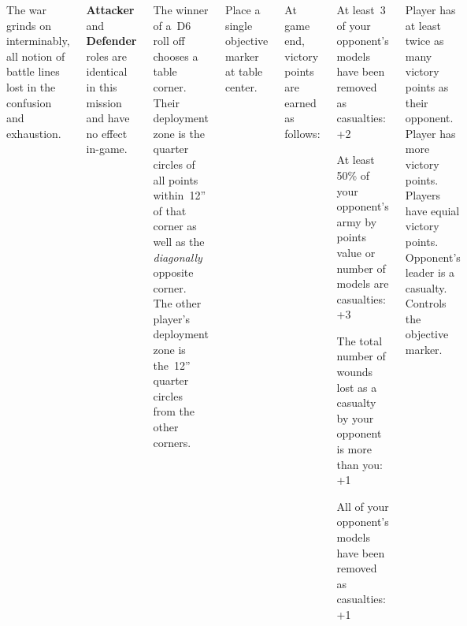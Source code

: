 
\begin{columns}

  The war grinds on interminably, all notion of battle lines lost in
  the confusion and exhaustion.

  \textbf{Attacker} and \textbf{Defender} roles are identical in this
  mission and have no effect in-game.

%

The winner of a~D6 roll off chooses a table corner.  Their deployment
zone is the quarter circles of all points within~12'' of that corner
as well as the \emph{diagonally} opposite corner.  The other player's
deployment zone is the~12'' quarter circles from the other corners.

Place a single objective marker at table center.


%

At game end, victory points are earned as follows:

\begin{squishitemize}
\item At least~3 of your opponent's models have been removed as
  casualties: +2

\item At least 50\% of your opponent's army by points value or number
  of models are casualties: +3

\item The total number of wounds lost as a casualty by your opponent
  is more than you: +1

\item All of your opponent's models have been removed as casualties:
  +1
\end{squishitemize}

\vspace*{-2pt}

\scoringbox%
{Player has at least twice as many victory points as their opponent.}%
{Player has more victory points.}%
{Players have equial victory points.}%
{Opponent's leader is a casualty.}%
{Controls the objective marker.}

\end{columns}
